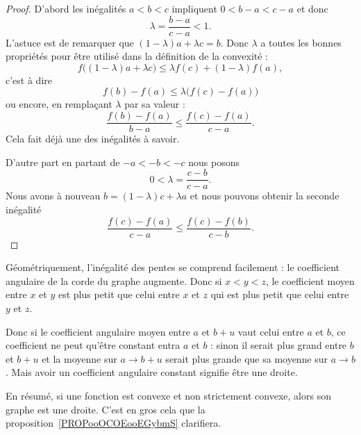 \begin{proof}
    D'abord les inégalités \( a<b<c\) impliquent \( 0<b-a<c-a\) et donc
    \begin{equation}
        \lambda=\frac{ b-a }{ c-a }<1.
    \end{equation}
    L'astuce est de remarquer que \( (1-\lambda)a+\lambda c=b\). Donc \( \lambda\) a toutes les bonnes propriétés pour être utilisé dans la définition de la convexité :
    \begin{equation}
        f\big( (1-\lambda)a+\lambda c \big)\leq \lambda f(c)+(1-\lambda)f(a),
    \end{equation}
    c'est à dire
    \begin{equation}
        f(b)-f(a)\leq \lambda\big( f(c)-f(a) \big)
    \end{equation}
    ou encore, en remplaçant \( \lambda\) par sa valeur :
    \begin{equation}
        \frac{ f(b)-f(a) }{ b-a }\leq \frac{ f(c)-f(a) }{ c-a }.
    \end{equation}
    Cela fait déjà une des inégalités à savoir.

    D'autre part en partant de \( -a<-b<-c\) nous posons
    \begin{equation}
        0<\lambda=\frac{ c-b }{ c-a }.
    \end{equation}
    Nous avons à nouveau \( b=(1-\lambda)c+\lambda a\) et nous pouvons obtenir la seconde inégalité
    \begin{equation}
        \frac{ f(c)-f(a) }{ c-a }\leq \frac{ f(c)-f(b) }{ c-b }.
    \end{equation}
\end{proof}

Géométriquement, l'inégalité des pentes se comprend facilement : le coefficient angulaire de la corde du graphe augmente. Donc si \( x<y<z\), le coefficient moyen entre \( x\) et \( y\) est plus petit que celui entre \( x\) et \( z\) qui est plus petit que celui entre \( y\) et \( z\).

Donc si le coefficient angulaire moyen entre \( a\) et \( b+u\) vaut celui entre \( a\) et \( b\), ce coefficient ne peut qu'être constant entra \( a\) et \( b\) : sinon il serait plus grand entre \( b\) et \( b+u\) et la moyenne sur \( a\to b+u\) serait plus grande que sa moyenne sur \( a\to b\). Mais avoir un coefficient angulaire constant signifie être une droite.

En résumé, si une fonction est convexe et non strictement convexe, alors son graphe est une droite. C'est en gros cela que la proposition~\ref{PROPooOCOEooEGybmS} clarifiera.

